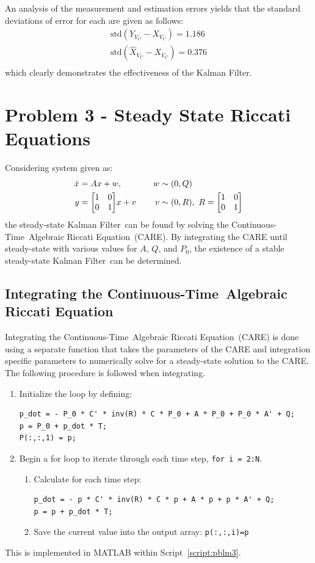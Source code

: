 \documentclass[]{article}
\renewcommand{\lstlistingname}{Script}
\newcommand{\scriptname}{\lstlistingname}
\newcommand{\KF}{Kalman Filter}
\newcommand{\CT}{Continuous-Time}
\newcommand{\CARE}{\CT \ Algebraic Riccati Equation}
\begin{document}
		An analysis of the measurement and estimation errors yields that the standard deviations of error for each are given as follows:
		\begin{equation}
			\begin{aligned}
				\text{std}(Y_{V_C} - X_{V_C}) = 1.186\\
		 		\text{std}(\hat{X}_{V_C} - X_{V_C}) = 0.376\\
			\end{aligned}
		\end{equation}
		which clearly demonstrates the effectiveness of the \KF.


\newpage
\section{Problem 3 - Steady State Riccati Equations}
	Considering system given as:
	\begin{equation}
		\begin{aligned}
			\dot{x} &= A x + w, &&& w &\sim (0,Q)\\
			y		&= \mqty[\imat{2}] x + v&&& v &\sim (0,R),\ R = \mqty[\imat{2}]\\
		\end{aligned}
	\end{equation}
	the steady-state \KF \ can be found by solving the \CARE \ (CARE). By integrating the CARE until steady-state with various values for $A$, $Q$, and $P_0$, the existence of a stable steady-state \KF \ can be determined.
	
	\subsection{Integrating the \CARE}
	
		Integrating the \CARE \ (CARE) is done using a separate function that takes the parameters of the CARE and integration specific parameters to numerically solve for a steady-state solution to the CARE. The following procedure is followed when integrating.
		\begin{enumerate}
			\item Initialize the loop by defining:
\begin{lstlisting}
p_dot = - P_0 * C' * inv(R) * C * P_0 + A * P_0 + P_0 * A' + Q;
p = P_0 + p_dot * T;
P(:,:,1) = p;
\end{lstlisting}
			\item Begin a for loop to iterate through each time step, \lstinline{for i = 2:N}.
			\begin{enumerate}
				\item Calculate for each time step:
\begin{lstlisting}
p_dot = - p * C' * inv(R) * C * p + A * p + p * A' + Q;
p = p + p_dot * T;
\end{lstlisting}
				\item Save the current value into the output array: \lstinline{p(:,:,i)=p}
			\end{enumerate}
		\end{enumerate}
		This is implemented in MATLAB within \scriptname \ \ref{script:pblm3}.
	
\end{document}
